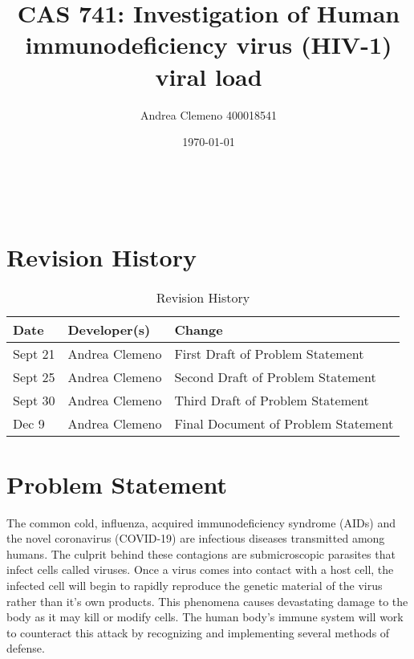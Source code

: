 \documentclass[12pt]{article}
\begin{document}
\title{CAS 741: Investigation of Human 
immunodeficiency virus (HIV-1) viral load}

\author{Andrea Clemeno  400018541}

\date{\today}
\maketitle

~\newpage



\section{Revision History}

\begin{table}[hp]
\caption{Revision History} \label{TblRevisionHistory}
\begin{tabularx}{\textwidth}{llX}
\toprule
\textbf{Date} & \textbf{Developer(s)} & \textbf{Change}\\
\midrule
Sept 21 & Andrea Clemeno & First Draft of Problem Statement\\
Sept 25 & Andrea Clemeno & Second Draft of Problem Statement\\
Sept 30 & Andrea Clemeno & Third Draft of Problem Statement\\
Dec 9 & Andrea Clemeno & Final Document of Problem Statement\\


\bottomrule
\end{tabularx}
\end{table}


\newpage
\section{Problem Statement}

The common cold, influenza, acquired immunodeficiency syndrome (AIDs) and the 
novel coronavirus (COVID-19) are infectious diseases transmitted among humans. 
The culprit behind these contagions are submicroscopic parasites that infect 
cells called viruses. Once a virus comes into contact with a host cell, the 
infected cell will begin to rapidly reproduce the genetic material of the virus 
rather than it’s own products. This phenomena causes devastating damage to the 
body as it may kill or modify cells. The human body’s immune system will work to 
counteract this attack by recognizing and implementing several methods of 
defense. 
\end{document}
